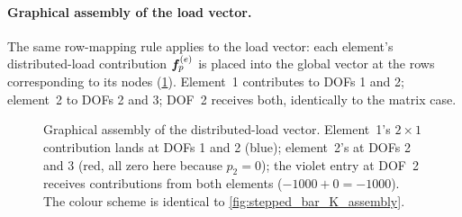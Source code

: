 \begin{example}
\paragraph{Graphical assembly of the load vector.}
The same row-mapping rule applies to the load vector: each element's
distributed-load contribution $\bm{f}_p^{(e)}$ is placed into the global
vector at the rows corresponding to its nodes
(\cref{fig:stepped_bar_F_assembly}). Element~1 contributes to DOFs 1 and 2;
element~2 to DOFs 2 and 3; DOF~2 receives both, identically to the matrix
case.

\begin{figure}[htbp]
\centering
{}
\caption{Graphical assembly of the distributed-load vector. Element~1's
$2{\times}1$ contribution lands at DOFs 1 and 2 (blue); element~2's at
DOFs 2 and 3 (red, all zero here because $p_2 = 0$); the violet entry
at DOF~2 receives contributions from both elements
($-1000 + 0 = -1000$). The colour scheme is identical to
\cref{fig:stepped_bar_K_assembly}.}
\label{fig:stepped_bar_F_assembly}
\end{figure}


\end{example}
